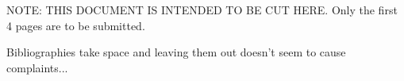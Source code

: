 \documentclass[11pt,preprint]{aastex_nofoot}
\begin{document}
\clearpage

NOTE: THIS DOCUMENT IS INTENDED TO BE CUT HERE.  Only the first 4 pages are to be submitted.


% 
% 
% 



\clearpage
{\color{red} Bibliographies take space and leaving them out doesn't seem to cause complaints...}
\footnotesize\raggedright
\noindent 
%

\normalsize
%
\end{document}
